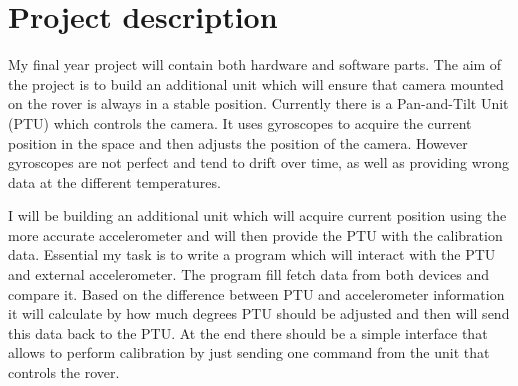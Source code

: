 \documentclass[11pt,fleqn,twoside]{article}
\begin{document}
\wordcount{}

\mmp

\setcounter{tocdepth}{3} %


\section{Project description}

My final year project will contain both hardware and software parts. The aim of the project is to build an additional unit which will ensure that camera mounted on the rover is always in a stable position. Currently there is a Pan-and-Tilt Unit (PTU) which controls the camera. It uses gyroscopes to acquire the current position in the space and then adjusts the position of the camera. However gyroscopes are not perfect and tend to drift over time, as well as providing wrong data at the different temperatures. 

I will be building an additional unit which will acquire current position using the more accurate accelerometer and will then provide the PTU with the calibration data. Essential my task is to write a program which will interact with the PTU and external accelerometer. The program fill fetch data from both devices and compare it. Based on the difference between PTU and accelerometer information it will calculate by how much degrees PTU should be adjusted and then will send this data back to the PTU. At the end there should be a simple interface that allows to perform calibration by just sending one command from the unit that controls the rover.    
\end{document}

